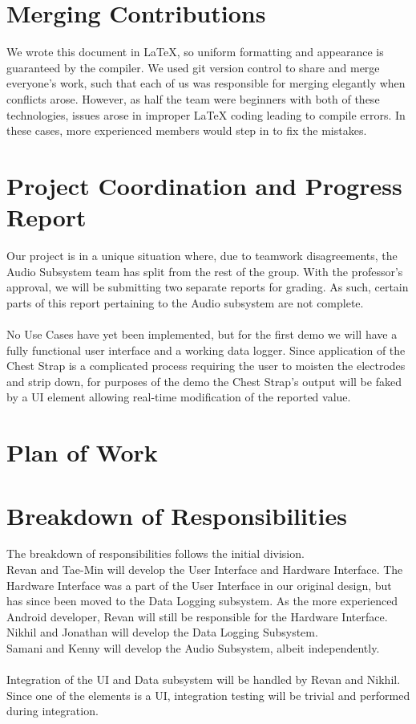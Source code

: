 \documentclass[letterpaper,english, 12pt]{scrreprt}
\begin{document}
\section{Merging Contributions}
We wrote this document in \LaTeX, so uniform formatting and appearance is guaranteed by the compiler.
We used git version control to share and merge everyone's work, such that each of us was responsible for merging elegantly when conflicts arose.
However, as half the team were beginners with both of these technologies, issues arose in improper LaTeX coding leading to compile errors.
In these cases, more experienced members would step in to fix the mistakes.

\section{Project Coordination and Progress Report}
Our project is in a unique situation where, due to teamwork disagreements, the Audio Subsystem team has split from the rest of the group.
With the professor's approval, we will be submitting two separate reports for grading.
As such, certain parts of this report pertaining to the Audio subsystem are not complete.
\\
\\
No Use Cases have yet been implemented, but for the first demo we will have a fully functional user interface and a working data logger.
Since application of the Chest Strap is a complicated process requiring the user to moisten the electrodes and strip down, for purposes of the demo the Chest Strap's output will be faked by a UI element allowing real-time modification of the reported value.
\section{Plan of Work}

\section{Breakdown of Responsibilities}
The breakdown of responsibilities follows the initial division.
\\
Revan and Tae-Min will develop the User Interface and Hardware Interface.
The Hardware Interface was a part of the User Interface in our original design, but has since been moved to the Data Logging subsystem.
As the more experienced Android developer, Revan will still be responsible for the Hardware Interface.
\\
Nikhil and Jonathan will develop the Data Logging Subsystem.
\\
Samani and Kenny will develop the Audio Subsystem, albeit independently.
\\
\\
Integration of the UI and Data subsystem will be handled by Revan and Nikhil.
\\
Since one of the elements is a UI, integration testing will be trivial and performed during integration.
\end{document}
